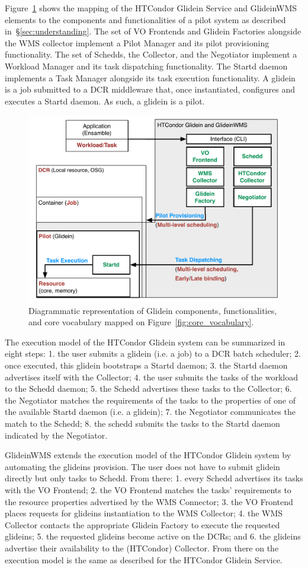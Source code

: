 \documentclass{sig-alternate}
\begin{document}
Figure~\ref{fig:glidein_comparison} shows the mapping of the HTCondor Glidein
Service and GlideinWMS elements to the components and functionalities of a pilot
system as described in~\S\ref{sec:understanding}. The set of VO Frontends and
Glidein Factories alongside the WMS collector implement a Pilot Manager and its
pilot provisioning functionality. The set of Schedds, the Collector, and the
Negotiator implement a Workload Manager and its task dispatching functionality.
The Startd daemon implements a Task Manager alongside its task execution
functionality. A glidein is a job submitted to a DCR middleware that, once
instantiated, configures and executes a Startd daemon. As such, a glidein is a
pilot.

\begin{figure}[t]
    \centering
        \includegraphics[width=.48\textwidth]{figures/glidein_comparison.pdf}
        \caption{Diagrammatic representation of Glidein components,
          functionalities, and core vocabulary mapped on
          Figure~\ref{fig:core_vocabulary}.}
    \label{fig:glidein_comparison}
\end{figure}

The execution model of the HTCondor Glidein system can be summarized in eight
steps: 1. the user submits a glidein (i.e. a job) to a DCR batch scheduler; 2.
once executed, this glidein bootstraps a Startd daemon; 3. the Startd daemon
advertises itself with the Collector; 4. the user submits the tasks of the
workload to the Schedd daemon; 5. the Schedd advertises these tasks to the
Collector; 6. the Negotiator matches the requirements of the tasks to the
properties of one of the available Startd daemon (i.e. a glidein); 7. the
Negotiator communicates the match to the Schedd; 8. the schedd submits the tasks
to the Startd daemon indicated by the Negotiator.

GlideinWMS extends the execution model of the HTCondor Glidein system by
automating the glideins provision. The user does not have to submit glidein
directly but only tasks to Schedd. From there: 1. every Schedd advertises its
tasks with the VO Frontend; 2. the VO Frontend matches the tasks' requirements
to the resource properties advertised by the WMS Connector; 3. the VO Frontend
places requests for glideins instantiation to the WMS Collector; 4. the WMS
Collector contacts the appropriate Glidein Factory to execute the requested
glideins; 5. the requested glideins become active on the DCRs; and 6. the
glideins advertise their availability to the (HTCondor) Collector. From there
on the execution model is the same as described for the HTCondor Glidein
Service.
\end{document}

